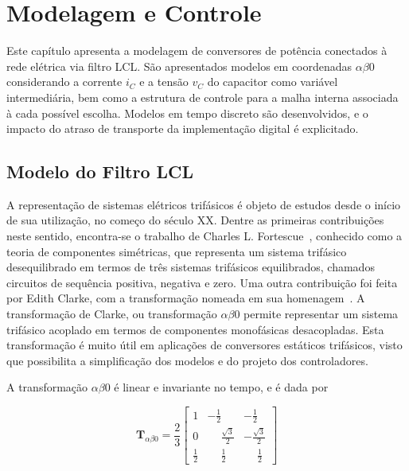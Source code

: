 
\chapter{Modelagem e Controle}\label{modelagem}

	Este capítulo apresenta a modelagem de conversores de potência conectados à rede
    elétrica via filtro LCL. São apresentados modelos em coordenadas $\alpha \beta 0$
    considerando a corrente $i_C$ e a tensão $v_C$ do capacitor como variável
    intermediária, bem como a estrutura de controle para a malha interna associada à
    cada possível escolha. Modelos em tempo discreto são desenvolvidos, e o impacto do
    atraso de transporte da implementação digital é explicitado.


\section{Modelo do Filtro LCL}

    A representação de sistemas elétricos trifásicos é objeto de estudos desde o
    início de sua utilização, no começo do século XX. Dentre as primeiras contribuições
    neste sentido, encontra-se o trabalho de Charles L. Fortescue~\cite{ref:FORTESCUE},
    conhecido como a teoria de componentes simétricas, que representa um sistema trifásico
    desequilibrado em termos de três sistemas trifásicos equilibrados, chamados circuitos
    de sequência positiva, negativa e zero. Uma outra contribuição foi feita por Edith
    Clarke, com a transformação nomeada em sua homenagem~\cite{ref:CLARKE}. A transformação
    de Clarke, ou transformação $\alpha \beta 0$ permite representar um sistema trifásico
    acoplado em termos de componentes monofásicas desacopladas. Esta transformação é muito
    útil em aplicações de conversores estáticos trifásicos, visto que possibilita a
    simplificação dos modelos e do projeto dos controladores.

    A transformação $\alpha \beta 0$ é linear e invariante no tempo, e é dada por

    \begin{equation}
        \mathbf{T}_{\alpha \beta 0} = \frac{2}{3} \left[
        \begin{array}{ccc}
            1 & -\frac{1}{2} & -\frac{1}{2} \\[0.3em]
            0 & \phantom{-}\frac{\sqrt{3}}{2} & -\frac{\sqrt{3}}{2} \\[0.3em]
            \frac{1}{2} &  \phantom{-}\frac{1}{2} & \phantom{-}\frac{1}{2}
        \end{array}
        \right]
        \label{eq:alpha_beta_0}
    \end{equation}

